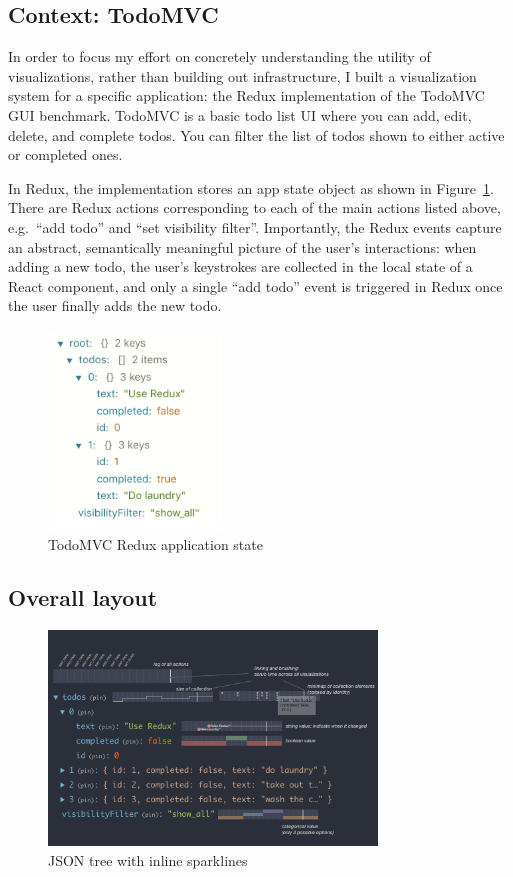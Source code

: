 \documentclass{sigchi}
\begin{document}
\hypertarget{context-todomvc}{%
\subsection{Context: TodoMVC}\label{context-todomvc}}

In order to focus my effort on concretely understanding the utility of
visualizations, rather than building out infrastructure, I built a
visualization system for a specific application: the Redux
implementation of the TodoMVC GUI benchmark. TodoMVC is a basic todo
list UI where you can add, edit, delete, and complete todos. You can
filter the list of todos shown to either active or completed ones.

In Redux, the implementation stores an app state object as shown in
Figure~\ref{fig:todomvc-state}. There are Redux actions corresponding to
each of the main actions listed above, e.g.~``add todo'' and ``set
visibility filter''. Importantly, the Redux events capture an abstract,
semantically meaningful picture of the user's interactions: when adding
a new todo, the user's keystrokes are collected in the local state of a
React component, and only a single ``add todo'' event is triggered in
Redux once the user finally adds the new todo.

\begin{figure}
\hypertarget{fig:todomvc-state}{%
\centering
\includegraphics[width=1.82292in,height=2.08333in]{images/todomvc-state.png}
\caption{TodoMVC Redux application state}\label{fig:todomvc-state}
}
\end{figure}

\hypertarget{overall-layout}{%
\subsection{Overall layout}\label{overall-layout}}

\begin{figure}
\hypertarget{fig:mockup}{%
\centering
\includegraphics[width=3.4375in,height=2.25in]{images/mockup.png}
\caption{JSON tree with inline sparklines}\label{fig:mockup}
}
\end{figure}
\end{document}
